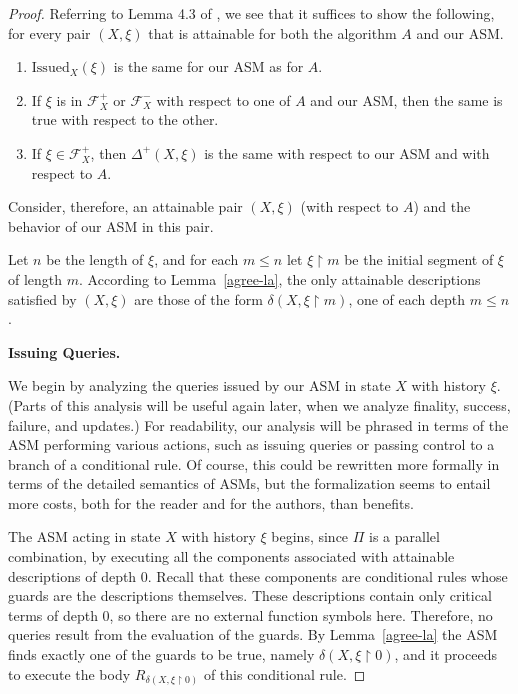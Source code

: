 \documentclass{LMCS}
\theoremstyle{definition}
\newenvironment{lsnum}{\begin{enumerate}}{\end{enumerate}}
\newcommand{\DD}{\Delta^+}
\newcommand{\Issued}{\text{Issued}}
\newcommand{\restr}{\mathop{\upharpoonright}}
\newcommand{\scr}[1]{\ensuremath{\mathcal {#1}}}
\begin{document}
\begin{proof}
 Referring to Lemma 4.3 of \cite{ga1}, we see that it suffices to
show the following, for every pair $(X,\xi)$ that is attainable for
both the algorithm $A$ and our ASM.
\begin{lsnum}
\item $\Issued_X(\xi)$ is the same for our ASM as for $A$.
\item If $\xi$ is in $\scr F_X^+$ or $\scr F_X^-$ with respect to one
  of $A$ and our ASM,
  then the same is true with respect to the other.
\item If $\xi\in\scr F_X^+$, then $\DD(X,\xi)$ is the same with
  respect to our ASM and with respect to $A$.
\end{lsnum}

Consider, therefore, an attainable pair $(X,\xi)$ (with respect to
$A$) and the behavior of our ASM in this pair.

Let $n$ be the length of $\xi$, and for each $m\leq n$ let $\xi\restr
m$ be the initial segment of $\xi$ of length $m$.  According to
Lemma~\ref{agree-la}, the only attainable descriptions satisfied by
$(X,\xi)$ are those of the form $\delta(X,\xi\restr m)$, one of each
depth $m\leq n$.

\medskip\noindent\textbf{Issuing Queries.}

We begin by analyzing the queries issued by our ASM in state $X$
with history $\xi$.  (Parts of this analysis will be useful again
later, when we analyze finality, success, failure, and updates.)
For readability, our analysis will be phrased in terms of the ASM
performing various actions, such as issuing queries or passing
control to a branch of a conditional rule.  Of course, this could
be rewritten more formally in terms of the detailed  semantics of
ASMs, but the formalization seems to entail more costs, both for
the reader and for the authors, than benefits.

The ASM acting in state $X$ with history $\xi$ begins, since $\Pi$
is a parallel combination, by executing all the components
associated with attainable descriptions of depth 0.  Recall that
these components are conditional rules whose guards are the
descriptions themselves. These descriptions contain only critical
terms of depth 0, so there are no external function symbols here.
Therefore, no queries result from the evaluation of the guards. By
Lemma~\ref{agree-la} the ASM finds exactly one of the guards to be
true, namely $\delta(X,\xi\restr0)$, and it proceeds to execute
the body $R_{\delta(X,\xi\restr0)}$ of this conditional rule.


\end{proof}
\end{document}
